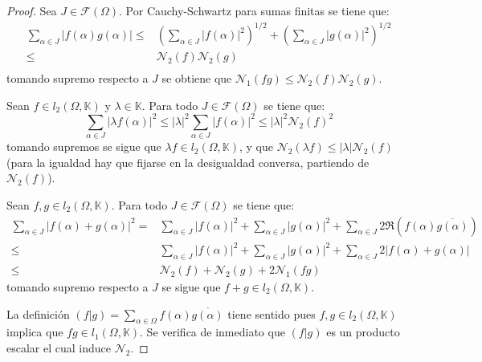 \documentclass[12pt]{report}
\newcounter{it}
\theoremstyle{largebreak}
\newcommand\abs[1]{\ensuremath{\big|#1\big|}}
\newcommand\pint[2]{\ensuremath{\left(#1\big| #2\right)}}
\newcommand\conj[1]{\ensuremath{\overline{#1}}}
\begin{document}
    \begin{proof}
        Sea $J\in\mathcal{F}(\Omega)$. Por Cauchy-Schwartz para sumas finitas se tiene que:
        \begin{equation*}
            \begin{split}
                \sum_{\alpha\in J }\abs{f(\alpha)g(\alpha)}\leq&\left( \sum_{\alpha\in J }\abs{f(\alpha)}^2 \right)^{1/2}+\left( \sum_{\alpha\in J }\abs{g(\alpha)}^2 \right)^{1/2}\\
                \leq&\mathcal{N}_2(f)\mathcal{N}_2(g) \\
            \end{split}
        \end{equation*}
        tomando supremo respecto a $J$ se obtiene que $\mathcal{N}_1(fg)\leq\mathcal{N}_2(f)\mathcal{N}_2(g)$.

        Sean $f\in l_2(\Omega,\mathbb{K})$ y $\lambda\in\mathbb{K}$. Para todo $J\in\mathcal{F}(\Omega)$ se tiene que:
        \begin{equation*}
            \sum_{\alpha\in J}\abs{\lambda f(\alpha)}^2\leq\abs{\lambda}^2\sum_{\alpha\in J}\abs{f(\alpha)}^2\leq\abs{\lambda}^2\mathcal{N}_2(f)^2
        \end{equation*}
        tomando supremos se sigue que $\lambda f\in l_2(\Omega,\mathbb{K})$, y que $\mathcal{N}_2(\lambda f)\leq\abs{\lambda}\mathcal{N}_2(f)$ (para la igualdad hay que fijarse en la desigualdad conversa, partiendo de $\mathcal{N}_2(f)$).

        Sean $f,g\in l_2(\Omega,\mathbb{K})$. Para todo $J\in\mathcal{F}(\Omega)$ se tiene que:
        \begin{equation*}
            \begin{split}
                \sum_{\alpha\in J }\abs{f(\alpha)+g(\alpha)}^2=&\sum_{\alpha\in J }\abs{f(\alpha)}^2+\sum_{\alpha\in J }\abs{g(\alpha)}^2+\sum_{\alpha\in J }2\Re(f(\alpha)\conj{g(\alpha)})\\
                \leq&\sum_{\alpha\in J }\abs{f(\alpha)}^2+\sum_{\alpha\in J }\abs{g(\alpha)}^2+\sum_{\alpha\in J }2\abs{f(\alpha)+g(\alpha)}\\
                \leq& \mathcal{N}_2(f)+\mathcal{N}_2(g)+2\mathcal{N}_1(fg)
            \end{split}
        \end{equation*}
        tomando supremo respecto a $J$ se sigue que $f+g\in l_2(\Omega,\mathbb{K})$.

        La definición $\pint{f}{g}=\sum_{\alpha\in\Omega}f(\alpha)\conj{g(\alpha)}$ tiene sentido pues $f,g\in l_2(\Omega,\mathbb{K})$ implica que $fg\in l_1(\Omega,\mathbb{K})$. Se verifica de inmediato que $\pint{f}{g}$ es un producto escalar el cual induce $\mathcal{N}_2$.


\end{proof}
\end{document}

